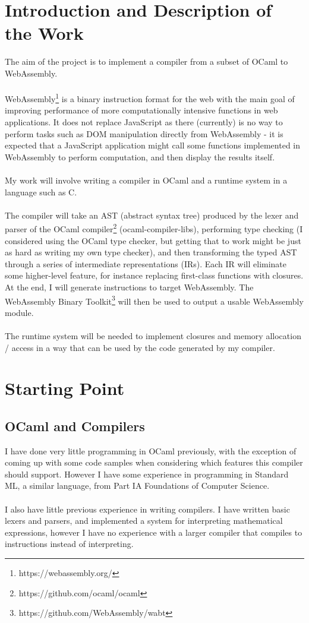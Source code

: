 	\section*{Introduction and Description of the Work}
	The aim of the project is to implement a compiler from a subset of OCaml to WebAssembly.
	\\\\
	WebAssembly\footnote{https://webassembly.org/} is a binary instruction format for the web with the main goal of improving performance of more computationally intensive functions in web applications. It does not replace JavaScript as there (currently) is no way to perform tasks such as DOM manipulation directly from WebAssembly - it is expected that a JavaScript application might call some functions implemented in WebAssembly to perform computation, and then display the results itself.
	\\\\
	My work will involve writing a compiler in OCaml and a runtime system in a language such as C. 
	\\\\
	The compiler will take an AST (abstract syntax tree) produced by the lexer and parser of the OCaml compiler\footnote{https://github.com/ocaml/ocaml} (ocaml-compiler-libs), performing type checking (I considered using the OCaml type checker, but getting that to work might be just as hard as writing my own type checker), and then transforming the typed AST through a series of intermediate representations (IRs). Each IR will eliminate some higher-level feature, for instance replacing first-class functions with closures. At the end, I will generate instructions to target WebAssembly. The WebAssembly Binary Toolkit\footnote{https://github.com/WebAssembly/wabt} will then be used to output a usable WebAssembly module.
	\\\\
	The runtime system will be needed to implement closures and memory allocation / access in a way that can be used by the code generated by my compiler.
	
	\section*{Starting Point}
	\subsection*{OCaml and Compilers}
	I have done very little programming in OCaml previously, with the exception of coming up with some code samples when considering which features this compiler should support. However I have some experience in programming in Standard ML, a similar language, from Part IA Foundations of Computer Science.
	\\\\
	I also have little previous experience in writing compilers. I have written basic lexers and parsers, and implemented a system for interpreting mathematical expressions, however I have no experience with a larger compiler that compiles to instructions instead of interpreting.
	
